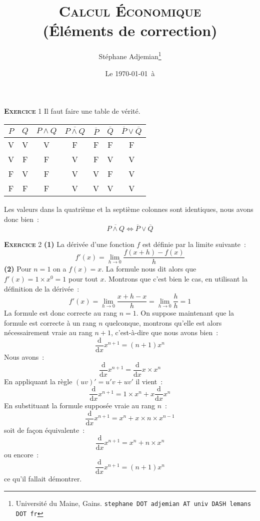 \documentclass[10pt,a4paper,notitlepage]{article}
\newcommand{\exercice}[1]{\textsc{\textbf{Exercice}} #1}
\begin{document}
\title{\textsc{Calcul Économique}\\\textbf{(Éléments de correction)}}
\author{Stéphane Adjemian\thanks{Université du Maine, Gains. \texttt{stephane DOT adjemian AT univ DASH lemans DOT fr}}}
\date{Le \today\ à \thistime}

\maketitle

\exercice{1} Il faut faire une table de vérité.
\begin{table}[H]
  \centering
  \begin{tabular}{cc|ccccc}
    $P$ & $Q$ & $P \land Q$ & $\overline{P \land Q}$ & $\overline{P}$
    & $\overline{Q}$ & $\overline{P} \lor \overline{Q}$\\ \hline
    V & V & V & F & F & F & F \\
    V & F & F & V & F & V & V \\
    F & V & F & V & V & F & V \\
    F & F & F & V & V & V & V \\
  \end{tabular}
\end{table}
Les valeurs dans la quatrième et la septième colonnes sont identiques,
nous avons donc bien :  
\[
\overline{P \land Q} \Leftrightarrow \overline{P} \lor \overline{Q}
\]

\bigskip

\exercice{2} \textbf{(1)} La dérivée d'une fonction $f$ est définie
par la limite suivante :
\[
f'(x) = \lim_{h\rightarrow 0} \frac{f(x+h)-f(x)}{h}
\]
\textbf{(2)} Pour $n=1$ on a $f(x) = x$. La formule nous dit alors que
$f'(x) = 1\times x^0 = 1$ pour tout $x$. Montrons que c'est bien le
cas, en utilisant la définition de la dérivée :
\[
f'(x) = \lim_{h\rightarrow 0} \frac{x+h-x}{h} = \lim_{h\rightarrow 0}
\frac{h}{h} = 1 
\]
La formule est donc correcte au rang $n=1$. On suppose maintenant que
la formule est correcte à un rang $n$ quelconque, montrons qu'elle est
alors nécessairement vraie au rang $n+1$, c'est-à-dire que nous avons
bien :
\[
\frac{\mathrm d}{\mathrm dx}x^{n+1} = (n+1)x^n
\]
Nous avons :
\[
\frac{\mathrm d}{\mathrm dx} x^{n+1} = \frac{\mathrm d}{\mathrm dx} x
\times x^n
\]
En appliquant la règle $(uv)'=u'v+uv'$ il vient :
\[
\frac{\mathrm d}{\mathrm dx} x^{n+1} = 1 \times x^n + x \frac{\mathrm
  d}{\mathrm dx} x^n
\]
En substituant la formule supposée vraie au rang $n$ :
\[
\frac{\mathrm d}{\mathrm dx} x^{n+1} = x^n + x \times n \times x^{n-1}
\]
soit de façon équivalente :
\[
\frac{\mathrm d}{\mathrm dx} x^{n+1} = x^n + n \times x^{n}
\]
ou encore :
\[
\frac{\mathrm d}{\mathrm dx} x^{n+1} = (n+1) x^{n}
\]
ce qu'il fallait démontrer.
\end{document}

